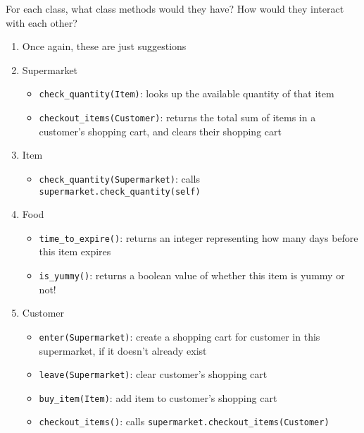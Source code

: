 \begin{blocksection}
\question For each class, what class methods would they have? How would they interact with each other?
\begin{solution}[1.5in]
\begin{enumerate}[1.]
\item Once again, these are just suggestions
\item Supermarket
\begin{itemize}
    \setlength\itemsep{-0.25em}
    \item \lstinline{check_quantity(Item)}: looks up the available quantity of that item
    \item \lstinline{checkout_items(Customer)}: returns the total sum of items in a customer's shopping cart, and clears their shopping cart
\end{itemize}
\item Item
\begin{itemize}
    \item \lstinline{check_quantity(Supermarket)}: calls \lstinline{supermarket.check_quantity(self)}
\end{itemize}
\item Food
\begin{itemize}
    \setlength\itemsep{-0.5em}
    \item \lstinline{time_to_expire()}: returns an integer representing how many days before this item expires
    \item \lstinline{is_yummy()}: returns a boolean value of whether this item is yummy or not!
\end{itemize}
\item Customer
\begin{itemize}
    \item \lstinline{enter(Supermarket)}: create a shopping cart for customer in this supermarket, if it doesn't already exist
    \item \lstinline{leave(Supermarket)}: clear customer's shopping cart
    \item \lstinline{buy_item(Item)}: add item to customer's shopping cart
    \item \lstinline{checkout_items()}: calls \lstinline{supermarket.checkout_items(Customer)}
\end{itemize}
\end{enumerate}
\end{solution}

\end{blocksection}


